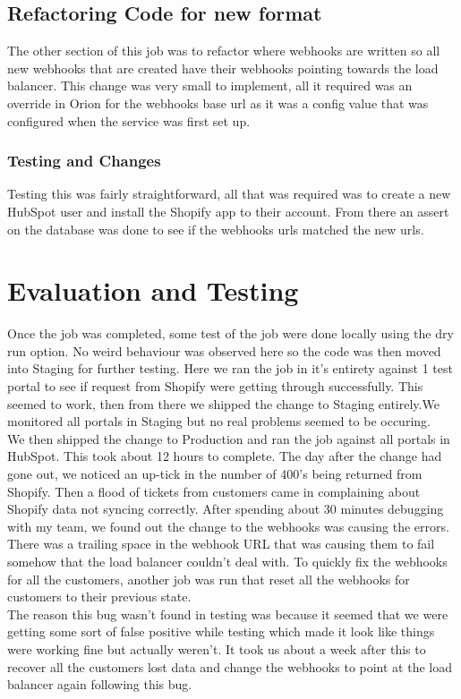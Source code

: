 \subsection{Refactoring Code for new format}
The other section of this job was to refactor where webhooks are written so all new webhooks that are created have their webhooks pointing towards the load balancer. This change was very small to implement, all it required was an override in Orion for the webhooks base url as it was a config value that was configured when the service was first set up.

\subsubsection{Testing and Changes}
Testing this was fairly straightforward, all that was required was to create a new HubSpot user and install the Shopify app to their account. From there an assert on the database was done to see if the webhooks urls matched the new urls.

\section{Evaluation and Testing}
Once the job was completed, some test of the job were done locally using the dry run option. No weird behaviour was observed here so the code was then moved into Staging for further testing. Here we ran the job in it's entirety against 1 test portal to see if request from Shopify were getting through successfully. This seemed to work, then from there we shipped the change to Staging entirely.We monitored all portals in Staging but no real problems seemed to be occuring. \newline \\
We then shipped the change to Production and ran the job against all portals in HubSpot. This took about 12 hours to complete. The day after the change had gone out, we noticed an up-tick in the number of 400's being returned from Shopify. Then a flood of tickets from customers came in complaining about Shopify data not syncing correctly. After spending about 30 minutes debugging with my team, we found out the change to the webhooks was causing the errors. There was a trailing space in the webhook URL that was causing them to fail somehow that the load balancer couldn't deal with. To quickly fix the webhooks for all the customers, another job was run that reset all the webhooks for customers to their previous state.\newline \\ The reason this bug wasn't found in testing was because it seemed that we were getting some sort of false positive while testing which made it look like things were working fine but actually weren't. It took us about a week after this to recover all the customers lost data and change the webhooks to point at the load balancer again following this bug. 

